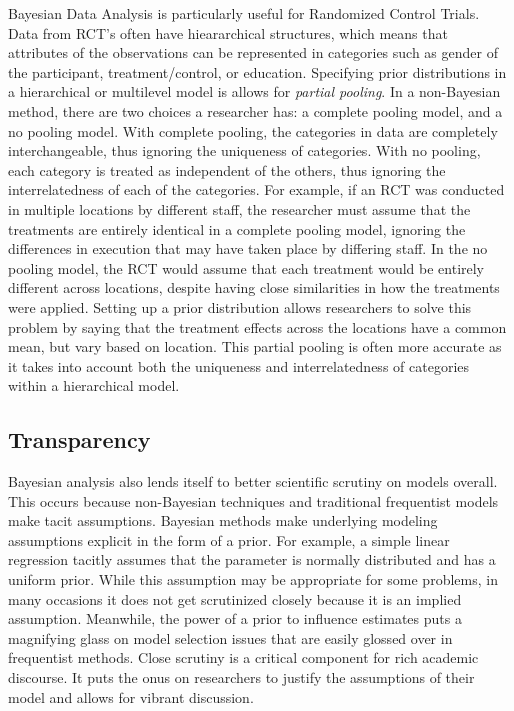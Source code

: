 \documentclass{article}
\begin{document}
Bayesian Data Analysis is particularly useful for Randomized Control Trials. Data from RCT's often have hieararchical structures, which means that attributes of the observations can be represented in categories such as gender of the participant, treatment/control, or education. Specifying prior distributions in a hierarchical or multilevel model is allows for \textit{partial pooling}. In a non-Bayesian method, there are two choices a researcher has: a complete pooling model, and a no pooling model. With complete pooling, the categories in data are completely interchangeable, thus ignoring the uniqueness of categories. With no pooling, each category is treated as independent of the others, thus ignoring the interrelatedness of each of the categories.  For example, if an RCT was conducted in multiple locations by different staff, the researcher must assume that the treatments are entirely identical in a complete pooling model, ignoring the differences in execution that may have taken place by differing staff. In the no pooling model, the RCT would assume that each treatment would be entirely different across locations, despite having close similarities in how the treatments were applied. Setting up a prior distribution allows researchers to solve this problem by saying that the treatment effects across the locations have a common mean, but vary based on location. This partial pooling is often more accurate as it takes into account both the uniqueness and interrelatedness of categories within a hierarchical model.

\subsection{Transparency}
Bayesian analysis also lends itself to better scientific scrutiny on models overall. This occurs because non-Bayesian techniques and traditional frequentist models make tacit assumptions. Bayesian methods make underlying modeling assumptions explicit in the form of a prior. For example, a simple linear regression tacitly assumes that the parameter is normally distributed and has a uniform prior. While this assumption may be appropriate for some problems, in many occasions it does not get scrutinized closely because it is an implied assumption. Meanwhile, the power of a prior to influence estimates puts a magnifying glass on model selection issues that are easily glossed over in frequentist methods.  Close scrutiny is a critical component for rich academic discourse. It puts the onus on researchers to justify the assumptions of their model and allows for vibrant discussion. 
\end{document}
